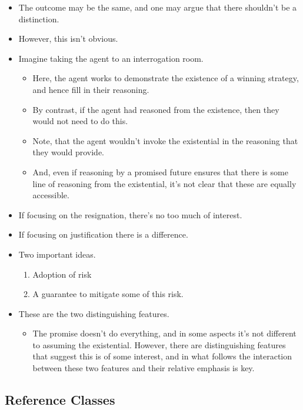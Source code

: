 \documentclass[10pt]{article}
\begin{document}
\begin{itemize}
\item The outcome may be the same, and one may argue that there shouldn't be a distinction.
\item However, this isn't obvious.
\item Imagine taking the agent to an interrogation room.
  \begin{itemize}
  \item Here, the agent works to demonstrate the existence of a winning strategy, and hence fill in their reasoning.
  \item By contrast, if the agent had reasoned from the existence, then they would not need to do this.
  \item Note, that the agent wouldn't invoke the existential in the reasoning that they would provide.
  \item And, even if reasoning by a promised future ensures that there is some line of reasoning from the existential, it's not clear that these are equally accessible.
  \end{itemize}
\item If focusing on the resignation, there's no too much of interest.
\item If focusing on justification there is a difference.
\end{itemize}

\begin{itemize}
\item Two important ideas.
  \begin{enumerate}
  \item Adoption of risk
  \item A guarantee to mitigate some of this risk.
  \end{enumerate}
\item These are the two distinguishing features.
  \begin{itemize}
  \item The promise doesn't do everything, and in some aspects it's not different to assuming the existential.
    However, there are distinguishing features that suggest this is of some interest, and in what follows the interaction between these two features and their relative emphasis is key.
  \end{itemize}
\end{itemize}


\subsection{Reference Classes}
\label{sec:reference-classes}
\end{document}
